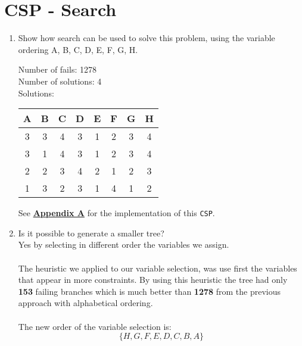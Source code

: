 \documentclass{article}
\def\ans#1{{\color{ans}#1}}
\begin{document}
\clearpage
\section{CSP - Search}
\begin{enumerate}[label=(\alph*)]
    \item Show how search can be used to solve this problem, using the variable ordering A, B, C, D, E, F, G, H. \\ 
    \ans{
        Number of fails: 1278 \\
        Number of solutions: 4 \\
        Solutions:
        \begin{center}
        \begin{tabular}{|c|c|c|c|c|c|c|c|}
            \hline
            {A} & {B} & {C} & {D} & {E} & {F} & {G} & {H} \\
            \hline
            \hline
            3 & 3 & 4 & 3 & 1 & 2 & 3 & 4 \\
            \hline
            3 & 1 & 4 & 3 & 1 & 2 & 3 & 4 \\
            \hline
            2 & 2 & 3 & 4 & 2 & 1 & 2 & 3 \\
            \hline
            1 & 3 & 2 & 3 & 1 & 4 & 1 & 2 \\
            \hline
        \end{tabular}
        \end{center}
    }
    \ans{
        See \hyperref[appendix:CSP Search]{\textbf{Appendix A}} for the implementation of this \texttt{CSP}.\\
    }
    \item Is it  possible  to  generate a  smaller  tree? \\
    \ans{
        Yes by selecting in different order the variables we assign. \\ \\
        The heuristic we applied to our variable selection, was use first the variables that appear in 
        more constraints. By using this heuristic the tree had only \textbf{153} failing branches which is 
        much better than \textbf{1278} from the previous approach with alphabetical ordering. \\ \\
        The new order of the variable selection is: \\
        \[
            \{H, G, F, E, D, C, B, A\}
        \]
    }

\end{enumerate}
\end{document}
